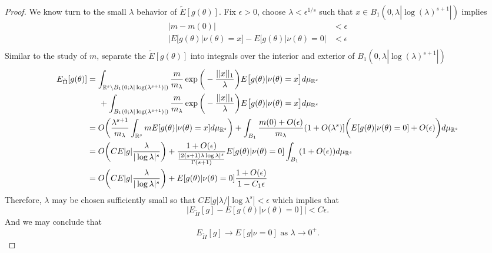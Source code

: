 \documentclass[10pt,fleqn]{article}
\DeclareMathOperator{\1}{\mathbbm{1}}
\begin{document}
{\begin{proof}
We know turn to the small $\lambda$ behavior of $\tilde{E}[g(\theta)].$  Fix $\epsilon >0$, choose $\lambda<\epsilon^{1/s}$ such that $x\in B_1(0,\lambda|\log(\lambda)^{s+1}|)$ implies
\begin{align*}
|m- m(0)| &< \epsilon \\
|E[g(\theta)|\nu(\theta)=x] - E[g(\theta)|\nu(\theta)=0 | & < \epsilon \\
\end{align*}
Similar to the study of $m$, separate the $\tilde{E}[g(\theta)]$ into integrals over the interior and exterior of $B_1(0,\lambda|\log(\lambda)^{s+1}|)$
\begin{align*}
E_{\tilde{\Pi}}[g(\theta)] &= \int_{\mathbb{R}^s \setminus B_1(0;\lambda|\log(\lambda^{s+1})|)} \frac{m}{m_\lambda}\exp\bigg(-\frac{||x||_1}{\lambda}\bigg) E\big[g(\theta)|\nu(\theta)=x\big] d\mu_{\mathbb{R}^s} \\
&\hspace{0.5 cm} + \int_{B_1(0;\lambda|\log(\lambda^{s+1})|)} \frac{m}{m_\lambda}\exp\bigg(-\frac{||x||_1}{\lambda}\bigg) E\big[g(\theta)|\nu(\theta)=x\big] d\mu_{\mathbb{R}^s} \\
&= O\bigg( \frac{\lambda^{s+1}}{m_\lambda} \int_{\mathbb{R}^s} m E[g(\theta)|\nu(\theta)=x]d\mu_{\mathbb{R}^s}\bigg) + \int_{B_1} \frac{m(0)+O(\epsilon)}{m_\lambda}(1+O(\lambda^s)]\bigg(E[g(\theta)|\nu(\theta)=0] + O(\epsilon)\bigg) d\mu_{\mathbb{R}^s}  \\
&= O\bigg( C E|g|\frac{\lambda}{|\log\lambda|^s}\bigg) + \frac{1+O(\epsilon)}{ \frac{|2(s+1)\lambda \log \lambda |^s}{\Gamma(s+1)} } E[g(\theta)|\nu(\theta) = 0] \int_{B_1}(1+O(\epsilon))d\mu_{\mathbb{R}^s} \\
&=O\bigg(C E|g|\frac{\lambda}{|\log\lambda|^s}\bigg)  +E[g(\theta)|\nu(\theta)=0] \frac{1+O(\epsilon)}{1-C_1\epsilon}
\end{align*}
Therefore, $\lambda$ may be chosen sufficiently small so that $CE|g|\lambda/|\log\lambda^s| < \epsilon $ which implies that 
$$\bigg|E_{\tilde{\Pi}}[g] - E[g(\theta)|\nu(\theta) = 0] \bigg| < C\epsilon.$$
And we may conclude that $$E_{\tilde{\Pi}}[g] \to E[g|\nu = 0] \text{ as } \lambda\to0^+.$$
\end{proof}
}



\end{document}
